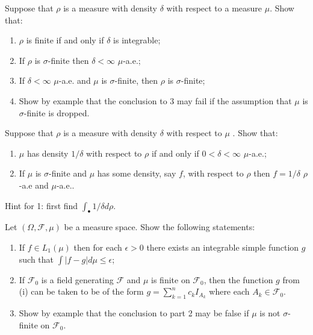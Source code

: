 \begin{exercise}
Suppose that $\rho$ is a measure with density $\delta$ with respect to a measure $\mu$. Show that:
\begin{enumerate}
\item $\rho$ is finite if and only if $\delta$ is integrable;
\item If $\rho$ is $\sigma$-finite then $\delta<\infty$ $\mu$-a.e.;
\item If $\delta<\infty$ $\mu$-a.e. and $\mu$ is $\sigma$-finite, then $\rho$ is $\sigma$-finite;
\item Show by example that the conclusion to 3 may fail if the assumption that $\mu$ is $\sigma$-finite is dropped.
\end{enumerate}

\begin{exercise}[{\bf Conditions for $d\mu/d\rho= 1/(d\rho/d\mu)$}]
\label{ex: 1/density}
Suppose that $\rho$ is a measure  with  density $\delta$ with respect to $\mu$ .
Show that:
\begin{enumerate}
\item $\mu$ has density $1/\delta$ with respect to $\rho$ if and only if $0<\delta<\infty$ $\mu$-a.e.;
\item If $\mu$ is $\sigma$-finite and $\mu$ has some density, say $f$, with respect to $\rho$ then  $f=1/\delta$ $\rho$-a.e and $\mu$-a.e..
\end{enumerate}
Hint for 1: first find $\int_\bullet 1/\delta d\rho$.
\end{exercise}

\end{exercise}



\begin{exercise}
Let $(\Omega, \mathcal F, \mu)$ be a measure space. Show the following statements:
\begin{enumerate}
\item If $f\in L_1(\mu)$ then for each $\epsilon>0$ there exists an integrable simple function $g$ such that $\int |f-g|d\mu\leq \epsilon$;
\item If $\mathcal F_0$ is a field generating $\mathcal F$ and $\mu$ is finite on $\mathcal F_0$, then the function $g$ from (i) can be taken to be of the form $g=\sum_{k=1}^n c_k I_{A_k}$ where each $A_k\in \mathcal F_0$.
\item Show by example that the conclusion to part 2 may be false if $\mu$ is not $\sigma$-finite on $\mathcal F_0$.
\end{enumerate}
\end{exercise}

